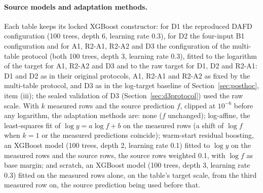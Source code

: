 \documentclass[11pt,a4paper]{article}
\begin{document}
\paragraph{Source models and adaptation methods.}\label{sec:adapt} Each table keeps its locked XGBoost
constructor: for D1 the reproduced DAFD configuration (100 trees, depth 6, learning rate 0.3), for D2 the
four-input B1 configuration and for A1, R2-A1, R2-A2 and D3 the configuration of the multi-table protocol
(both 100 trees, depth 3, learning rate 0.3), fitted to the logarithm of the target for A1, R2-A2 and D3 and to
the raw target for D1, D2 and R2-A1: D1 and D2 as in their original protocols, A1, R2-A1 and R2-A2 as
fixed by the multi-table protocol, and D3 as in the log-target baseline of Section~\ref{sec:posthoc},
item (iii); the sealed validation of D3 (Section~\ref{sec:d3protocol}) used the raw scale. With $k$ measured rows and the source
prediction $f$, clipped at $10^{-6}$ before any logarithm, the adaptation methods are: none ($f$ unchanged);
log-affine, the least-squares fit of $\log y = a \log f + b$ on the measured rows (a shift of $\log f$ when
$k = 1$ or the measured predictions coincide); warm-start residual boosting, an XGBoost model (100 trees, depth 2,
learning rate 0.1) fitted to $\log y$ on the measured rows and the source rows, the source rows weighted 0.1, with
$\log f$ as base margin; and scratch, an XGBoost model (100 trees, depth 3, learning rate 0.3) fitted on the
measured rows alone, on the table's target scale, from the third measured row on, the source prediction being
used before that.
\end{document}
